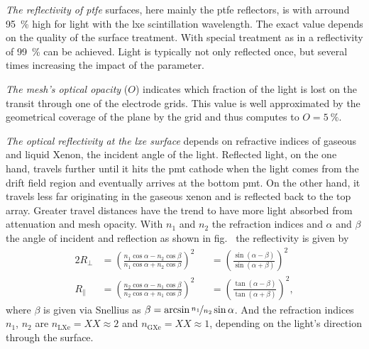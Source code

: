 \emph{The reflectivity of \gls{ptfe}} surfaces, here mainly the \gls{ptfe} reflectors, is with arround \SI{95}{\%} high for light with the \gls{lxe} scintillation wavelength.
The exact value depends on the quality of the surface treatment.
With special treatment as in \oneton a reflectivity of \SI{99}{\%} can be achieved\cite{}. %
Light is typically not only reflected once, but several times increasing the impact of the parameter.


\emph{The mesh's optical opacity} ($ O $) indicates which fraction of the light is lost on the transit through one of the electrode grids.
This value is well approximated by the geometrical coverage of the plane by the grid and thus computes to $ O = \SI{5}{\%} $.


\emph{The optical reflectivity at the \gls{lxe} surface} depends on refractive indices of gaseous and liquid Xenon, the incident angle of the light.
Reflected light, on the one hand, travels further until it hits the \gls{pmt} cathode when the light comes from the drift field region and eventually arrives at the bottom \gls{pmt}.
On the other hand, it travels less far originating in the gaseous xenon and is reflected back to the top array.
Greater travel distances have the trend to have more light absorbed from attenuation and mesh opacity.
With $ n_1 $ and $ n_2 $ the refraction indices and $ \alpha $ and $ \beta $ the angle of incident and reflection as shown in fig.~%
the reflectivity is given by \cite{}  %
\begin{alignat}{2}
    \label{eq:reflectivityA}
    R_\perp &= \left( \frac{ n_1 \cos{\alpha} - n_2 \cos{\beta} }{ n_1 \cos{\alpha} + n_2 \cos{\beta} } \right)^2 &
            &=  \left( \frac{ \sin{\left( \alpha-\beta \right)}}{ \sin{\left( \alpha+\beta \right)} } \right)^2 \\
    R_\parallel &= \left( \frac{ n_2 \cos{\alpha} - n_1 \cos{\beta} }{ n_2 \cos{\alpha} + n_1 \cos{\beta} } \right)^2 &
                &=  \left( \frac{ \tan{\left( \alpha-\beta \right)}}{ \tan{\left( \alpha+\beta \right)} } \right)^2,
    \label{eq:reflectivityB}
\end{alignat}
where $ \beta $ is given via Snellius as $ \beta = \arcsin{\nicefrac{n_1}{n_2} \sin{\alpha} } $.
And the refraction indices $ n_1 $, $ n_2 $ are $ n_\mathrm{LXe} = XX \approx 2 $ and $ n_\mathrm{GXe} = XX \approx 1 $, depending on the light's direction through the surface.


